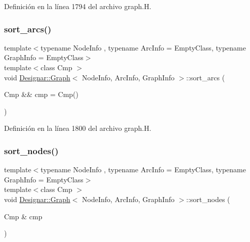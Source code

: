 Definición en la línea 1794 del archivo graph.\+H.

\mbox{\label{class_designar_1_1_graph_a37b5e36c96bf9efe44a0d6b83feb9656}} 
\subsubsection{\texorpdfstring{sort\+\_\+arcs()}{sort\_arcs()}\hspace{0.1cm}{\footnotesize\ttfamily [2/2]}}
{\footnotesize\ttfamily template$<$typename Node\+Info , typename Arc\+Info  = Empty\+Class, typename Graph\+Info  = Empty\+Class$>$ \\
template$<$class Cmp $>$ \\
void \hyperlink{class_designar_1_1_graph}{Designar\+::\+Graph}$<$ Node\+Info, Arc\+Info, Graph\+Info $>$\+::sort\+\_\+arcs (\begin{DoxyParamCaption}\item[{Cmp \&\&}]{cmp = {\ttfamily Cmp()} }\end{DoxyParamCaption})\hspace{0.3cm}{\ttfamily [inline]}}



Definición en la línea 1800 del archivo graph.\+H.

\mbox{\label{class_designar_1_1_graph_afcdce423516a879b23ec1b0fed201f20}} 
\subsubsection{\texorpdfstring{sort\+\_\+nodes()}{sort\_nodes()}\hspace{0.1cm}{\footnotesize\ttfamily [1/2]}}
{\footnotesize\ttfamily template$<$typename Node\+Info , typename Arc\+Info  = Empty\+Class, typename Graph\+Info  = Empty\+Class$>$ \\
template$<$class Cmp $>$ \\
void \hyperlink{class_designar_1_1_graph}{Designar\+::\+Graph}$<$ Node\+Info, Arc\+Info, Graph\+Info $>$\+::sort\+\_\+nodes (\begin{DoxyParamCaption}\item[{Cmp \&}]{cmp }\end{DoxyParamCaption})\hspace{0.3cm}{\ttfamily [inline]}}



